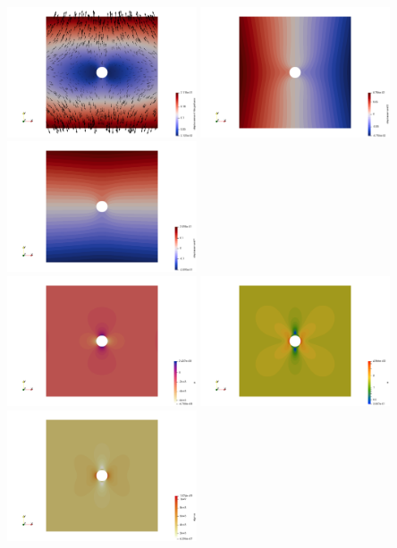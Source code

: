 \begin{center}
\includegraphics[width=5.6cm]{python_codes/fieldstone_124/results/exp3/disp}
\includegraphics[width=5.6cm]{python_codes/fieldstone_124/results/exp3/disp_x}
\includegraphics[width=5.6cm]{python_codes/fieldstone_124/results/exp3/disp_y}\\
\includegraphics[width=5.6cm]{python_codes/fieldstone_124/results/exp3/press}
\includegraphics[width=5.6cm]{python_codes/fieldstone_124/results/exp3/e}
\includegraphics[width=5.6cm]{python_codes/fieldstone_124/results/exp3/sigma}\\

\end{center}
